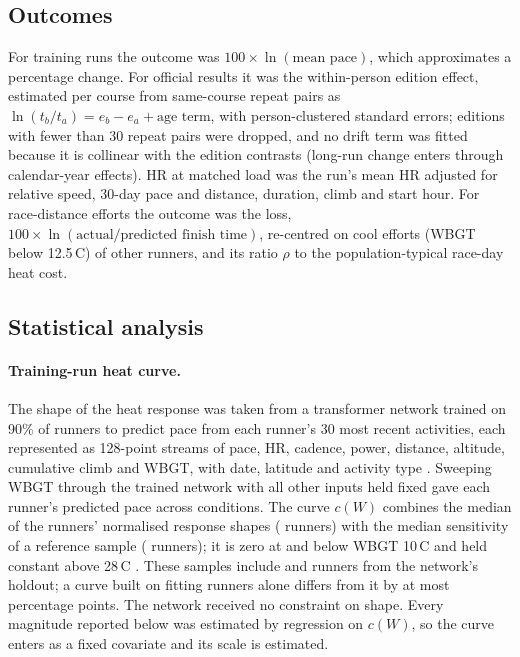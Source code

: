 \documentclass[12pt]{article}
\newcommand{\degC}{\,\textdegree C}
\newcommand{\cW}{$c(W)$}
\begin{document}
\subsection{Outcomes}
For training runs the outcome was $100 \times \ln(\text{mean pace})$, which approximates a percentage change. For official results it was the within-person edition effect, estimated per course from same-course repeat pairs as $\ln(t_b/t_a) = e_b - e_a + \text{age term}$, with person-clustered standard errors; editions with fewer than 30 repeat pairs were dropped, and no drift term was fitted because it is collinear with the edition contrasts (long-run change enters through calendar-year effects). HR at matched load was the run's mean HR adjusted for relative speed, 30-day pace and distance, duration, climb and start hour. For race-distance efforts the outcome was the loss, $100 \times \ln(\text{actual}/\text{predicted finish time})$, re-centred on cool efforts (WBGT below 12.5\degC) of other runners, and its ratio $\rho$ to the population-typical race-day heat cost.

\subsection{Statistical analysis}
\paragraph{Training-run heat curve.} The shape of the heat response was taken from a transformer network trained on 90\% of runners to predict pace from each runner's 30 most recent activities, each represented as 128-point streams of pace, HR, cadence, power, distance, altitude, cumulative climb and WBGT, with date, latitude and activity type \cite{dunphy2026extended}. Sweeping WBGT through the trained network with all other inputs held fixed gave each runner's predicted pace across conditions. The curve \cW{} combines the median of the runners' normalised response shapes (\curveShapeRunners{} runners) with the median sensitivity of a reference sample (\curveRefRunners{} runners); it is zero at and below WBGT 10\degC{} and held constant above 28\degC{} \cite{dunphy2026extended}. These samples include \curveShapeHoldout{} and \curveRefHoldout{} runners from the network's holdout; a curve built on fitting runners alone differs from it by at most \curveHoldoutDiff{} percentage points. The network received no constraint on shape. Every magnitude reported below was estimated by regression on \cW, so the curve enters as a fixed covariate and its scale is estimated.
\end{document}

